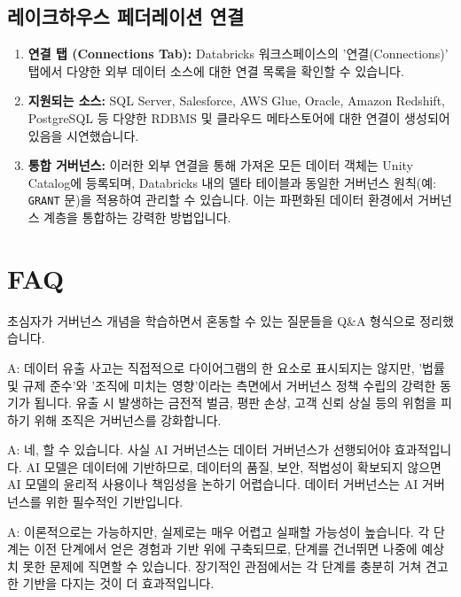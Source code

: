 \documentclass[11pt,a4paper]{article}
\theoremstyle{definition}
\begin{document}
\subsection*{레이크하우스 페더레이션 연결}

\begin{enumerate}
    \item \textbf{연결 탭 (Connections Tab):} Databricks 워크스페이스의 '연결(Connections)' 탭에서 다양한 외부 데이터 소스에 대한 연결 목록을 확인할 수 있습니다.
    \item \textbf{지원되는 소스:} SQL Server, Salesforce, AWS Glue, Oracle, Amazon Redshift, PostgreSQL 등 다양한 RDBMS 및 클라우드 메타스토어에 대한 연결이 생성되어 있음을 시연했습니다.
    \item \textbf{통합 거버넌스:} 이러한 외부 연결을 통해 가져온 모든 데이터 객체는 Unity Catalog에 등록되며, Databricks 내의 델타 테이블과 동일한 거버넌스 원칙(예: \texttt{GRANT} 문)을 적용하여 관리할 수 있습니다. 이는 파편화된 데이터 환경에서 거버넌스 계층을 통합하는 강력한 방법입니다.
\end{enumerate}

\newpage
\section*{FAQ}

초심자가 거버넌스 개념을 학습하면서 혼동할 수 있는 질문들을 Q\&A 형식으로 정리했습니다.

\begin{tcolorbox}[mybox, title={Q: 데이터 유출은 거버넌스 다이어그램에 어떻게 포함되나요?}]
A: 데이터 유출 사고는 직접적으로 다이어그램의 한 요소로 표시되지는 않지만, '법률 및 규제 준수'와 '조직에 미치는 영향'이라는 측면에서 거버넌스 정책 수립의 강력한 동기가 됩니다. 유출 시 발생하는 금전적 벌금, 평판 손상, 고객 신뢰 상실 등의 위험을 피하기 위해 조직은 거버넌스를 강화합니다.
\end{tcolorbox}

\begin{tcolorbox}[mybox, title={Q: AI 거버넌스 없이 데이터 거버넌스만 할 수 있나요?}]
A: 네, 할 수 있습니다. 사실 AI 거버넌스는 데이터 거버넌스가 선행되어야 효과적입니다. AI 모델은 데이터에 기반하므로, 데이터의 품질, 보안, 적법성이 확보되지 않으면 AI 모델의 윤리적 사용이나 책임성을 논하기 어렵습니다. 데이터 거버넌스는 AI 거버넌스를 위한 필수적인 기반입니다.
\end{tcolorbox}

\begin{tcolorbox}[mybox, title={Q: 거버넌스 성숙도 단계를 건너뛸 수 있나요?}]
A: 이론적으로는 가능하지만, 실제로는 매우 어렵고 실패할 가능성이 높습니다. 각 단계는 이전 단계에서 얻은 경험과 기반 위에 구축되므로, 단계를 건너뛰면 나중에 예상치 못한 문제에 직면할 수 있습니다. 장기적인 관점에서는 각 단계를 충분히 거쳐 견고한 기반을 다지는 것이 더 효과적입니다.
\end{tcolorbox}
\end{document}
